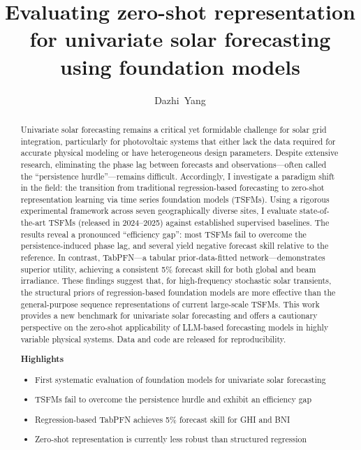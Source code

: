 \documentclass[number, 3p, 10pt, times]{elsarticle}
\begin{document}
\linenumbers

\begin{frontmatter}

\title{Evaluating zero-shot representation for univariate solar forecasting using foundation models}
\author[label1,label2]{Dazhi~Yang}
\address[label1]{School of Electrical Engineering and Automation, Harbin Institute of Technology, Harbin, Heilongjiang, China}
\address[label2]{Key Laboratory of Energy Meteorology, China Meteorological Administration, Beijing, China}


\begin{abstract}
Univariate solar forecasting remains a critical yet formidable challenge for solar grid integration, particularly for photovoltaic systems that either lack the data required for accurate physical modeling or have heterogeneous design parameters. Despite extensive research, eliminating the phase lag between forecasts and observations---often called the ``persistence hurdle''---remains difficult. Accordingly, I investigate a paradigm shift in the field: the transition from traditional regression-based forecasting to zero-shot representation learning via time series foundation models (TSFMs). Using a rigorous experimental framework across seven geographically diverse sites, I evaluate state-of-the-art TSFMs (released in 2024--2025) against established supervised baselines. The results reveal a pronounced ``efficiency gap'': most TSFMs fail to overcome the persistence-induced phase lag, and several yield negative forecast skill relative to the reference. In contrast, TabPFN---a tabular prior-data-fitted network---demonstrates superior utility, achieving a consistent 5\% forecast skill for both global and beam irradiance. These findings suggest that, for high-frequency stochastic solar transients, the structural priors of regression-based foundation models are more effective than the general-purpose sequence representations of current large-scale TSFMs. This work provides a new benchmark for univariate solar forecasting and offers a cautionary perspective on the zero-shot applicability of LLM-based forecasting models in highly variable physical systems. Data and code are released for reproducibility.


\textbf{Highlights}
\begin{itemize}
\item First systematic evaluation of foundation models for univariate solar forecasting
\item TSFMs fail to overcome the persistence hurdle and exhibit an efficiency gap
\item Regression-based TabPFN achieves 5\% forecast skill for GHI and BNI
\item Zero-shot representation is currently less robust than structured regression
\end{itemize}
\end{abstract}


\end{frontmatter}
\end{document}
